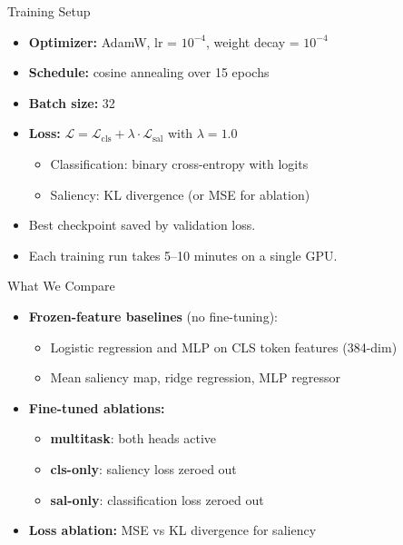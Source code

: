 \documentclass{beamer}
\begin{document}
\begin{frame}{Training Setup}
\begin{itemize}
  \item \textbf{Optimizer:} AdamW, lr = $10^{-4}$, weight decay = $10^{-4}$
  \item \textbf{Schedule:} cosine annealing over 15 epochs
  \item \textbf{Batch size:} 32
  \item \textbf{Loss:} $\mathcal{L} = \mathcal{L}_{\text{cls}} + \lambda \cdot \mathcal{L}_{\text{sal}}$ with $\lambda = 1.0$
  \begin{itemize}
    \item Classification: binary cross-entropy with logits
    \item Saliency: KL divergence (or MSE for ablation)
  \end{itemize}
  \item Best checkpoint saved by validation loss.
  \item Each training run takes 5--10 minutes on a single GPU.
\end{itemize}
\end{frame}

\begin{frame}{What We Compare}
\begin{itemize}
  \item \textbf{Frozen-feature baselines} (no fine-tuning):
  \begin{itemize}
    \item Logistic regression and MLP on CLS token features (384-dim)
    \item Mean saliency map, ridge regression, MLP regressor
  \end{itemize}
  \item \textbf{Fine-tuned ablations:}
  \begin{itemize}
    \item \textbf{multitask}: both heads active
    \item \textbf{cls-only}: saliency loss zeroed out
    \item \textbf{sal-only}: classification loss zeroed out
  \end{itemize}
  \item \textbf{Loss ablation:} MSE vs KL divergence for saliency
\end{itemize}
\end{frame}
\end{document}
